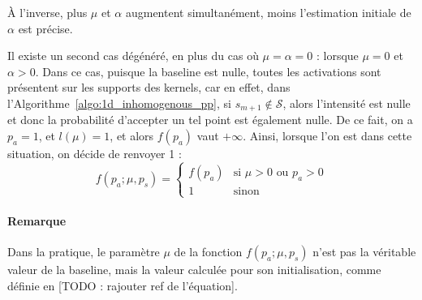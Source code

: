 À l'inverse, plus $\mu$ et $\alpha$ augmentent simultanément, moins l'estimation initiale de $\alpha$ est précise.

Il existe un second cas dégénéré, en plus du cas où $\mu = \alpha = 0$ : lorsque $\mu = 0$ et $\alpha > 0$.
Dans ce cas, puisque la baseline est nulle, toutes les activations sont présentent sur les supports des kernels, car en effet, dans l'Algorithme~\ref{algo:1d_inhomogenous_pp}, si $s_{m+1} \notin \mathcal{S}$, alors l'intensité est nulle et donc la probabilité d'accepter un tel point est également nulle.
De ce fait, on a $p_a = 1$, et $l(\mu) = 1$, et alors $f(p_a)$ vaut $+\infty$.
Ainsi, lorsque l'on est dans cette situation, on décide de renvoyer 1 :
\begin{equation}
    f(p_a ; \mu, p_s) = 
    \left\{
		\begin{array}{ll}
			f(p_a) & \mbox{si } \mu > 0 \text{ ou } p_a > 0 \\
			1 & \mbox{sinon}
		\end{array}
	\right.
\end{equation}

\paragraph{Remarque} Dans la pratique, le paramètre $\mu$ de la fonction $f(p_a ; \mu, p_s)$ n'est pas la véritable valeur de la baseline, mais la valeur calculée pour son initialisation, comme définie en [TODO : rajouter ref de l'équation].


